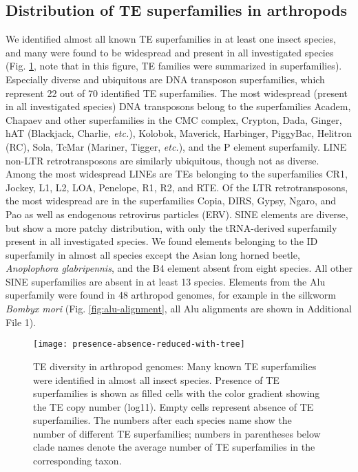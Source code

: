 \subsection{Distribution of TE superfamilies in arthropods}

We identified almost all known TE superfamilies in at least one insect
species, and many were found to be widespread and present in all
investigated species (Fig. \ref{fig:presence-absence}, note that in this
figure, TE families were summarized in superfamilies). Especially
diverse and ubiquitous are DNA transposon superfamilies, which represent
22 out of 70 identified TE superfamilies. The most widespread (present
in all investigated species) DNA transposons belong to the superfamilies
Academ, Chapaev and other superfamilies in the CMC complex, Crypton,
Dada, Ginger, hAT (Blackjack, Charlie, \emph{etc.}), Kolobok, Maverick,
Harbinger, PiggyBac, Helitron (RC), Sola, TcMar (Mariner, Tigger,
\emph{etc.}), and the P element superfamily. LINE non-LTR
retrotransposons are similarly ubiquitous, though not as diverse. Among
the most widespread LINEs are TEs belonging to the superfamilies CR1,
Jockey, L1, L2, LOA, Penelope, R1, R2, and RTE. Of the LTR
retrotransposons, the most widespread are in the superfamilies Copia,
DIRS, Gypsy, Ngaro, and Pao as well as endogenous retrovirus particles
(ERV). SINE elements are diverse, but show a more patchy distribution,
with only the tRNA-derived superfamily present in all investigated
species. We found elements belonging to the ID superfamily in almost all
species except the Asian long horned beetle, \emph{Anoplophora
glabripennis}, and the B4 element absent from eight species. All other
SINE superfamilies are absent in at least 13 species.  Elements from the
Alu superfamily were found in 48 arthropod genomes, for example in the
silkworm \emph{Bombyx mori} (Fig. \ref{fig:alu-alignment}, all Alu
alignments are shown in Additional File 1).

\begin{figure}[h!]
\begin{center}
\texttt{[image: presence-absence-reduced-with-tree]}
\caption[TE superfamily diversity in arthropod genomes]{{TE diversity in
arthropod genomes: Many known TE superfamilies were identified in almost
all insect species. Presence of TE superfamilies is shown as filled
cells with the color gradient showing the TE copy number (log11). Empty
cells represent absence of TE superfamilies. The numbers after each
species name show the number of different TE superfamilies; numbers in
parentheses below clade names denote the average number of TE
superfamilies in the corresponding taxon.%
\label{fig:presence-absence}
}}
\end{center}
\end{figure}

